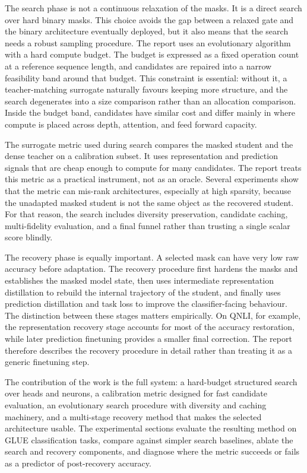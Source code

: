 The search phase is not a continuous relaxation of the masks. It is a direct search over hard binary masks. This choice avoids the gap between a relaxed gate and the binary architecture eventually deployed, but it also means that the search needs a robust sampling procedure. The report uses an evolutionary algorithm with a hard compute budget. The budget is expressed as a fixed operation count at a reference sequence length, and candidates are repaired into a narrow feasibility band around that budget. This constraint is essential: without it, a teacher-matching surrogate naturally favours keeping more structure, and the search degenerates into a size comparison rather than an allocation comparison. Inside the budget band, candidates have similar cost and differ mainly in where compute is placed across depth, attention, and feed forward capacity.

The surrogate metric used during search compares the masked student and the dense teacher on a calibration subset. It uses representation and prediction signals that are cheap enough to compute for many candidates. The report treats this metric as a practical instrument, not as an oracle. Several experiments show that the metric can mis-rank architectures, especially at high sparsity, because the unadapted masked student is not the same object as the recovered student. For that reason, the search includes diversity preservation, candidate caching, multi-fidelity evaluation, and a final funnel rather than trusting a single scalar score blindly.

The recovery phase is equally important. A selected mask can have very low raw accuracy before adaptation. The recovery procedure first hardens the masks and establishes the masked model state, then uses intermediate representation distillation to rebuild the internal trajectory of the student, and finally uses prediction distillation and task loss to improve the classifier-facing behaviour. The distinction between these stages matters empirically. On QNLI, for example, the representation recovery stage accounts for most of the accuracy restoration, while later prediction finetuning provides a smaller final correction. The report therefore describes the recovery procedure in detail rather than treating it as a generic finetuning step.

The contribution of the work is the full system: a hard-budget structured search over heads and neurons, a calibration metric designed for fast candidate evaluation, an evolutionary search procedure with diversity and caching machinery, and a multi-stage recovery method that makes the selected architecture usable. The experimental sections evaluate the resulting method on GLUE classification tasks, compare against simpler search baselines, ablate the search and recovery components, and diagnose where the metric succeeds or fails as a predictor of post-recovery accuracy.

